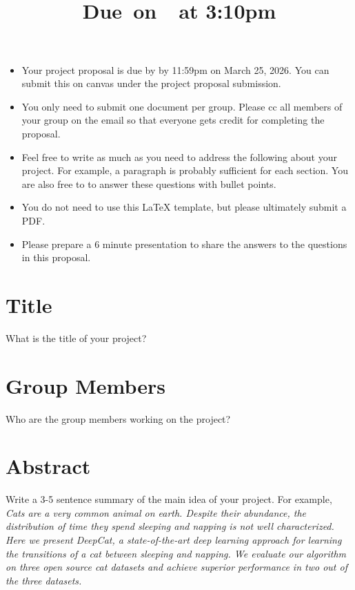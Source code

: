 \documentclass{article}
\title{
    \vspace{2in}
    \textmd{\textbf{\hmwkClass\hmwkTitle}}\\
    \normalsize\vspace{0.1in}\small{Due\ on\ \hmwkDueDate\ at 3:10pm}\\
    \vspace{3in}
}
\author{\hmwkAuthorName}
\date{}
\begin{document}

\begin{itemize}
\item Your project proposal is due by by 11:59pm on March 25, 2026. You can submit this on canvas under the project proposal submission.
\item You only need to submit one document per group. Please cc all members of your group on the email so that everyone gets credit for completing the proposal.  
\item Feel free to write as much as you need to address the following about your project. For example, a paragraph is probably sufficient for each section. You are also free to to answer these questions with bullet points. 
\item You do not need to use this LaTeX template, but please ultimately submit a PDF. 
\item Please prepare a 6 minute presentation to share the answers to the questions in this proposal. 
\end{itemize}

\section{Title}

What is the title of your project?

\section{Group Members}

Who are the group members working on the project? 

\section{Abstract}

Write a 3-5 sentence summary of the main idea of your project. For example, \\

\emph{Cats are a very common animal on earth. Despite their abundance, the distribution of time they spend sleeping and napping is not well characterized. Here we present DeepCat, a state-of-the-art deep learning approach for learning the transitions of a cat between sleeping and napping. We evaluate our algorithm on three open source cat datasets and achieve superior performance in two out of the three datasets.}
\end{document}
